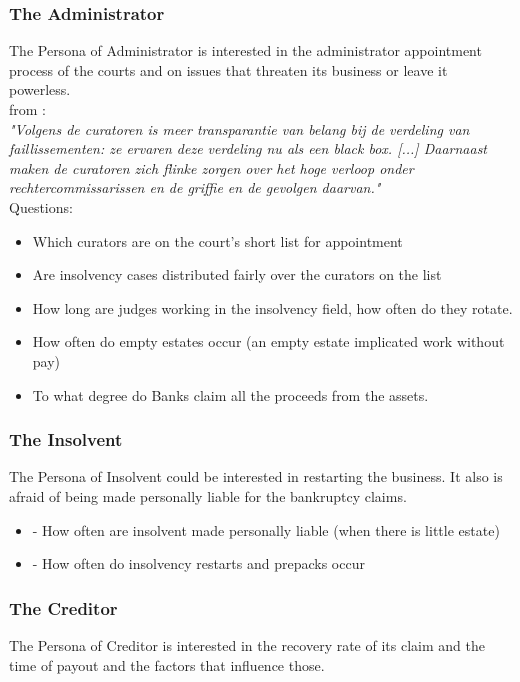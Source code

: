 \subsubsection{The Administrator}
The Persona of Administrator is interested in the administrator appointment process of the courts and on issues that threaten its business or leave it powerless.\\

from \cite{samr_2017:1}:\\
\textit{"Volgens de curatoren is meer transparantie van belang
bij de verdeling van faillissementen: ze ervaren deze
verdeling nu als een black box. [...] Daarnaast maken de curatoren
zich flinke zorgen over het hoge verloop onder rechtercommissarissen
en de griffie en de gevolgen daarvan."}\\

Questions:
\begin{itemize}
	\item Which curators are on the court’s short list for appointment
	\item Are insolvency cases distributed fairly over the curators on the list
	\item How long are judges working in the insolvency field, how often do they rotate.
	\item How often do empty estates occur (an empty estate implicated work without pay)
	\item To what degree do Banks claim all the proceeds from the assets.
\end{itemize}

\subsubsection{The Insolvent}
The Persona of Insolvent could be interested in restarting the business. It also is afraid of being made personally liable for the bankruptcy claims.

\begin{itemize}
	\item -	How often are insolvent made personally liable (when there is little estate)
	\item -	How often do insolvency restarts and prepacks occur
\end{itemize}

\subsubsection{The Creditor}
The Persona of Creditor is interested in the recovery rate of its claim and the time of payout and the factors that influence those.

